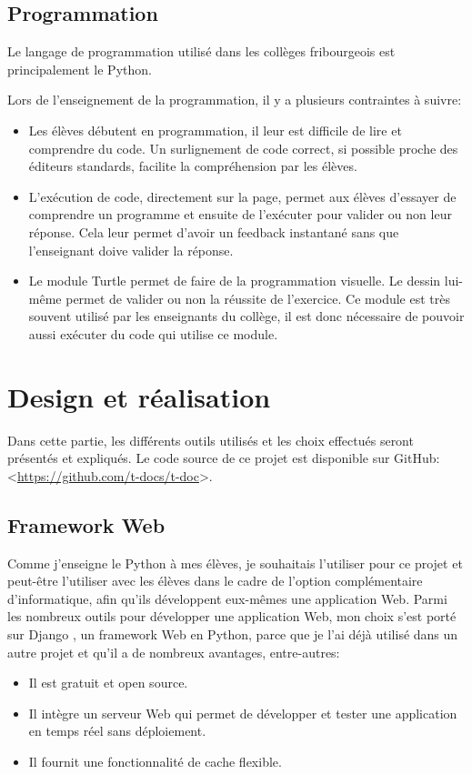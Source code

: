 \documentclass[12pt,titlepage,oneside]{article}
\renewcommand{\cite}[1]{}
\begin{document}
\subsection{Programmation}
Le langage de programmation utilisé dans les collèges fribourgeois est principalement le Python.\par
Lors de l'enseignement de la programmation, il y a plusieurs contraintes à suivre:
\begin{itemize}
\item Les élèves débutent en programmation, il leur est difficile de lire et comprendre du code. Un surlignement de code correct, si possible proche des éditeurs standards, facilite la compréhension par les élèves.
\item L'exécution de code, directement sur la page, permet aux élèves d'essayer de comprendre un programme et ensuite de l'exécuter pour valider ou non leur réponse. Cela leur permet d'avoir un feedback instantané sans que l'enseignant doive valider la réponse.
\item Le module Turtle permet de faire de la programmation visuelle. Le dessin lui-même permet de valider ou non la réussite de l'exercice. Ce module est très souvent utilisé par les enseignants du collège, il est donc nécessaire de pouvoir aussi exécuter du code qui utilise ce module.
\end{itemize}

\newpage

\section{Design et réalisation}
Dans cette partie, les différents outils utilisés et les choix effectués seront présentés et expliqués. Le code source de ce projet est disponible sur GitHub: <\url{https://github.com/t-docs/t-doc}>.\par

\subsection{Framework Web}
Comme j'enseigne le Python à mes élèves, je souhaitais l'utiliser pour ce projet et peut-être l'utiliser avec les élèves dans le cadre de l'option complémentaire d'informatique, afin qu'ils développent eux-mêmes une application Web. Parmi les nombreux outils pour développer une application Web, mon choix s'est porté sur Django \cite{django}, un framework Web en Python, parce que je l'ai déjà utilisé dans un autre projet et qu'il a de nombreux avantages, entre-autres:
\begin{itemize}
\item Il est gratuit et open source.
\item Il intègre un serveur Web qui permet de développer et tester une application en temps réel sans déploiement.
\item Il fournit une fonctionnalité de cache flexible.
\end{itemize}
\end{document}
